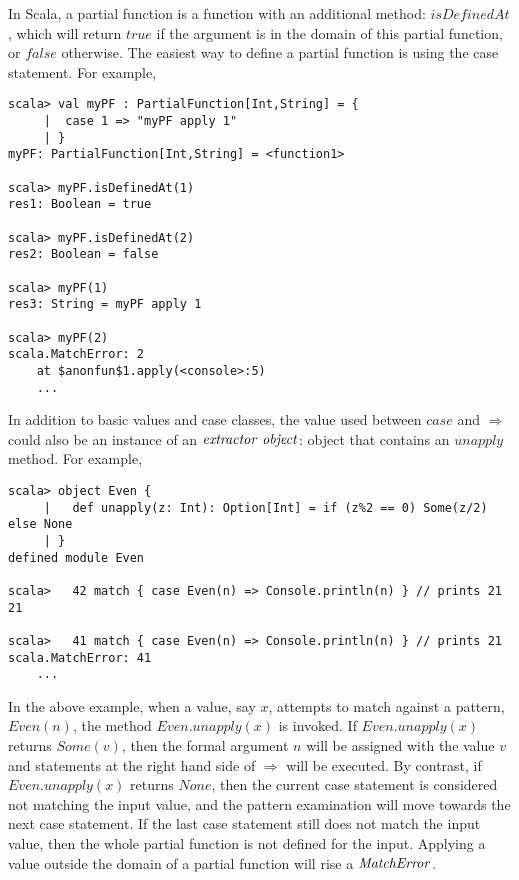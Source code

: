In Scala, a partial function is a function with an additional method: $isDefinedAt$, which will return $true$ if the argument is in the domain of this partial function, or $false$ otherwise.  The easiest way to define a partial function is using the case statement.  For example,

\begin{lstlisting}
scala> val myPF : PartialFunction[Int,String] = {
     |  case 1 => "myPF apply 1"
     | }
myPF: PartialFunction[Int,String] = <function1>

scala> myPF.isDefinedAt(1)
res1: Boolean = true

scala> myPF.isDefinedAt(2)
res2: Boolean = false

scala> myPF(1)            
res3: String = myPF apply 1

scala> myPF(2)            
scala.MatchError: 2
	at $anonfun$1.apply(<console>:5)
	...
\end{lstlisting}

In addition to basic values and case classes, the value used between $case$ and $\Rightarrow$ could also be an instance of an $\it{extractor\ object}$: object that contains an $unapply$ method\cite{extractors}.  For example,

\begin{lstlisting}
scala> object Even {
     |   def unapply(z: Int): Option[Int] = if (z%2 == 0) Some(z/2) else None
     | }
defined module Even

scala>   42 match { case Even(n) => Console.println(n) } // prints 21
21

scala>   41 match { case Even(n) => Console.println(n) } // prints 21
scala.MatchError: 41
	...
\end{lstlisting}

In the above example, when a value, say $x$, attempts to match against a pattern, $Even(n)$, the method $Even.unapply(x)$ is invoked.  If $Even.unapply(x)$ returns $Some(v)$, then the formal argument $n$ will be assigned with the value $v$ and statements at the right hand side of $\Rightarrow$ will be executed.  By contrast, if $Even.unapply(x)$ returns $None$, then the current case statement is considered not matching the input value, and the pattern examination will move towards the next case statement.  If the last case statement still does not match the input value, then the whole partial function is not defined for the input.  Applying a value outside the domain of a partial function will rise a $\it{MatchError}$.

\newpage
